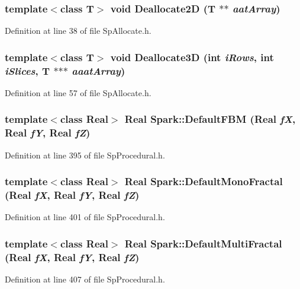\subsubsection{\setlength{\rightskip}{0pt plus 5cm}template$<$class T$>$ void Deallocate2D (T $\ast$$\ast$ {\em aat\-Array})}\label{namespaceSpark_a33}


Definition at line 38 of file Sp\-Allocate.h.
\subsubsection{\setlength{\rightskip}{0pt plus 5cm}template$<$class T$>$ void Deallocate3D (int {\em i\-Rows}, int {\em i\-Slices}, T $\ast$$\ast$$\ast$ {\em aaat\-Array})}\label{namespaceSpark_a35}


Definition at line 57 of file Sp\-Allocate.h.
\subsubsection{\setlength{\rightskip}{0pt plus 5cm}template$<$class Real$>$ Real Spark::Default\-FBM (Real {\em f\-X}, Real {\em f\-Y}, Real {\em f\-Z})}\label{namespaceSpark_a86}


Definition at line 395 of file Sp\-Procedural.h.
\subsubsection{\setlength{\rightskip}{0pt plus 5cm}template$<$class Real$>$ Real Spark::Default\-Mono\-Fractal (Real {\em f\-X}, Real {\em f\-Y}, Real {\em f\-Z})}\label{namespaceSpark_a87}


Definition at line 401 of file Sp\-Procedural.h.
\subsubsection{\setlength{\rightskip}{0pt plus 5cm}template$<$class Real$>$ Real Spark::Default\-Multi\-Fractal (Real {\em f\-X}, Real {\em f\-Y}, Real {\em f\-Z})}\label{namespaceSpark_a88}


Definition at line 407 of file Sp\-Procedural.h.
